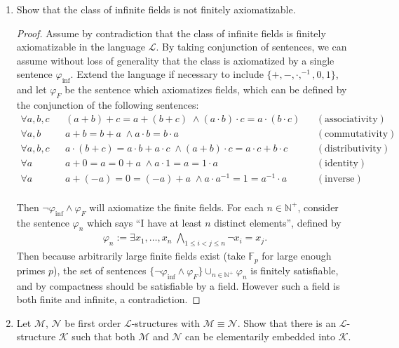\documentclass{article}
\begin{document}
\begin{enumerate}
  \item Show that the class of infinite fields is not finitely
    axiomatizable.
    \begin{proof}
      Assume by contradiction that the class of infinite fields is finitely
      axiomatizable in the language $\mathcal{L}$. By taking conjunction of
      sentences, we can assume without loss of generality that the class is
      axiomatized by a single sentence $\varphi_{\text{inf}}$. Extend the
      language if necessary to include $\{+,-,\cdot,^{-1},0,1\}$, and let
      $\varphi_F$ be the sentence which axiomatizes fields, which can be
      defined by the conjunction of the following sentences:
      \begin{align*}
        \forall a,b,c && (a+b)+c=a+(b+c)\; \wedge (a\cdot b)\cdot
          c=a\cdot(b\cdot c)  && (\text{associativity}) \\
        \forall a,b   && a+b=b+a\; \wedge a\cdot b=b\cdot a  &&
          (\text{commutativity}) \\
        \forall a,b,c && a\cdot(b+c)=a\cdot b+a\cdot c\; \wedge (a+b)\cdot
          c=a\cdot c+b\cdot c  && (\text{distributivity}) \\
        \forall a     && a+0=a=0+a\; \wedge a\cdot1=a=1\cdot a  &&
          (\text{identity}) \\
        \forall a     && a+(-a)=0=(-a)+a\; \wedge a\cdot
          a^{-1}=1=a^{-1}\cdot a  && (\text{inverse}) \\
      \end{align*}

      Then $\neg\varphi_{\text{inf}}\wedge\varphi_F$ will axiomatize the
      finite fields. For each $n\in\mathbb{N}^+$, consider the sentence
      $\varphi_n$ which says ``I have at least $n$ distinct elements'',
      defined by
      \begin{align*}
        \varphi_n := \exists x_1,\ldots,x_n\; \bigwedge_{1\leq i<j\leq n}
        \neg x_i=x_j.
      \end{align*}
      Then because arbitrarily large finite fields exist (take
      $\mathbb{F}_p$ for large enough primes $p$), the set of sentences
      $\{\neg\varphi_{\text{inf}}\wedge\varphi_F\}\cup_{n\in\mathbb{N}^+}\varphi_n$
      is finitely satisfiable, and by compactness should be satisfiable by
      a field. However such a field is both finite and infinite, a
      contradiction.
    \end{proof}

  \item Let $\mathcal{M}$, $\mathcal{N}$ be first order
    $\mathcal{L}$-structures with $\mathcal{M}\equiv\mathcal{N}$. Show that
    there is an $\mathcal{L}$-structure $\mathcal{K}$ such that both
    $\mathcal{M}$ and $\mathcal{N}$ can be elementarily embedded into
    $\mathcal{K}$. 


\end{enumerate}
\end{document}
